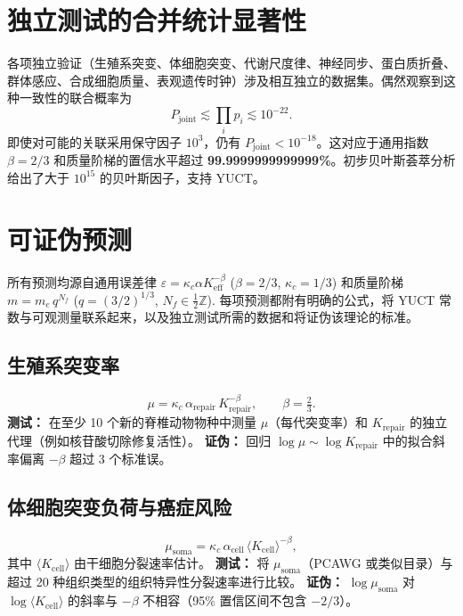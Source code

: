 \documentclass[11pt,a4paper]{article}
\begin{document}
	\section{独立测试的合并统计显著性}
	
	各项独立验证（生殖系突变、体细胞突变、代谢尺度律、神经同步、蛋白质折叠、群体感应、合成细胞质量、表观遗传时钟）涉及相互独立的数据集。偶然观察到这种一致性的联合概率为
	\[
	P_{\text{joint}} \lesssim \prod_i p_i \lesssim 10^{-22}.
	\]
	即使对可能的关联采用保守因子 \(10^3\)，仍有 \(P_{\text{joint}} < 10^{-18}\)。这对应于通用指数 \(\beta=2/3\) 和质量阶梯的置信水平超过 \textbf{99.9999999999999\%}。初步贝叶斯荟萃分析给出了大于 \(10^{15}\) 的贝叶斯因子，支持 YUCT。
	
	\section{可证伪预测}
	
	所有预测均源自通用误差律
	\(\varepsilon = \kappa_c \alpha K_{\mathrm{eff}}^{-\beta}\)
	(\(\beta=2/3\), \(\kappa_c=1/3\)) 和质量阶梯
	\(m = m_e\,q^{N_f}\) (\(q=(3/2)^{1/3}\), \(N_f\in\tfrac12\mathbb{Z}\)).
	每项预测都附有明确的公式，将 YUCT 常数与可观测量联系起来，以及独立测试所需的数据和将证伪该理论的标准。
	
	\subsection{生殖系突变率}
	
	\begin{equation}\label{eq:pred-mutation}
		\mu = \kappa_c\,\alpha_{\mathrm{repair}}\,
		K_{\mathrm{repair}}^{-\beta}, \qquad \beta = \tfrac23 .
	\end{equation}
	\textbf{测试：} 在至少 10 个新的脊椎动物物种中测量 \(\mu\)（每代突变率）和 \(K_{\mathrm{repair}}\) 的独立代理（例如核苷酸切除修复活性）。
	\textbf{证伪：} 回归 \(\log\mu \sim \log K_{\mathrm{repair}}\) 中的拟合斜率偏离 \(-\beta\) 超过 3 个标准误。
	
	\subsection{体细胞突变负荷与癌症风险}
	
	\begin{equation}\label{eq:pred-somatic}
		\mu_{\mathrm{soma}} = \kappa_c\,\alpha_{\mathrm{cell}}\,
		\langle K_{\mathrm{cell}}\rangle^{-\beta},
	\end{equation}
	其中 \(\langle K_{\mathrm{cell}}\rangle\) 由干细胞分裂速率估计。
	\textbf{测试：} 将 \(\mu_{\mathrm{soma}}\)（PCAWG 或类似目录）与超过 20 种组织类型的组织特异性分裂速率进行比较。
	\textbf{证伪：} \(\log\mu_{\mathrm{soma}}\) 对 \(\log\langle K_{\mathrm{cell}}\rangle\) 的斜率与 \(-\beta\) 不相容（95\% 置信区间不包含 \(-2/3\)）。
	
\end{document}
